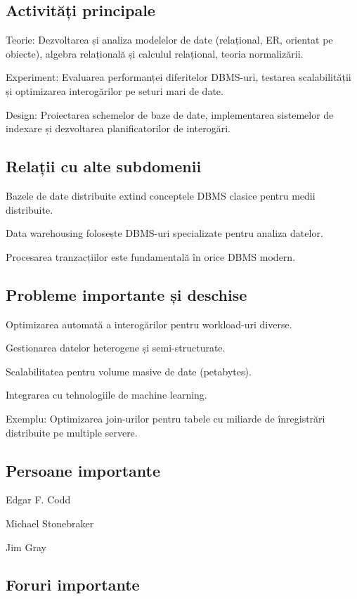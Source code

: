 \documentclass[12pt]{article}
\begin{document}
\subsection*{Activități principale}

Teorie: Dezvoltarea și analiza modelelor de date (relațional, ER, orientat pe obiecte), algebra relațională și calculul relațional, teoria normalizării.

Experiment: Evaluarea performanței diferitelor DBMS-uri, testarea scalabilității și optimizarea interogărilor pe seturi mari de date.

Design: Proiectarea schemelor de baze de date, implementarea sistemelor de indexare și dezvoltarea planificatorilor de interogări.

\subsection*{Relații cu alte subdomenii}

Bazele de date distribuite extind conceptele DBMS clasice pentru medii distribuite.

Data warehousing folosește DBMS-uri specializate pentru analiza datelor.

Procesarea tranzacțiilor este fundamentală în orice DBMS modern.

\subsection*{Probleme importante și deschise}

Optimizarea automată a interogărilor pentru workload-uri diverse.

Gestionarea datelor heterogene și semi-structurate.

Scalabilitatea pentru volume masive de date (petabytes).

Integrarea cu tehnologiile de machine learning.

Exemplu: Optimizarea join-urilor pentru tabele cu miliarde de înregistrări distribuite pe multiple servere.

\subsection*{Persoane importante}

Edgar F. Codd

Michael Stonebraker

Jim Gray

\subsection*{Foruri importante}
\end{document}
